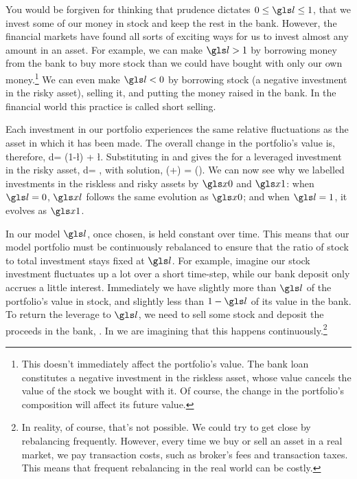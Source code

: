 You would be forgiven for thinking that prudence dictates $0\leq\l\leq1$, \ie that we invest some of our money in stock and keep the rest in the bank. However, the financial markets have found all sorts of exciting ways for us to invest almost any amount in an asset. For example, we can make $\l>1$ by borrowing money from the bank to buy more stock than we could have bought with only our own money.\footnote{This doesn't immediately affect the portfolio's value. The bank loan constitutes a negative investment in the riskless asset, whose value cancels the value of the stock we bought with it. Of course, the change in the portfolio's composition will affect its future value.} We can even make $\l<0$ by borrowing stock (a negative investment in the risky asset), selling it, and putting the money raised in the bank. In the financial world this practice is called short selling.

Each investment in our portfolio experiences the same relative fluctuations as the asset in which it has been made. The overall change in the portfolio's value is, therefore,
\be
d\xl = (1-\l)\xl {} + \l \xl {}.
\ee
Substituting in  and  gives the \SDE for a leveraged investment in the risky asset,
\be
d\xl = ,
\ee
with solution,
\be
\xl(\tn+\Dt) = \xl(\tn)\exp{}.
\ee
We can now see why we labelled investments in the riskless and risky assets by $\xzero$ and $\xone$: when $\l=0$, $\xl$ follows the same evolution as $\xzero$; and when $\l=1$, it evolves as $\xone$.

In our model $\l$, once chosen, is held constant over time. This means that our model portfolio must be continuously rebalanced to ensure that the ratio of stock to total investment stays fixed at $\l$. For example, imagine our stock investment fluctuates up a lot over a short time-step, while our bank deposit only accrues a little interest. Immediately we have slightly more than $\l$ of the portfolio's value in stock, and slightly less than $1-\l$ of its value in the bank. To return the leverage to $\l$, we need to sell some stock and deposit the proceeds in the bank, . In  we are imagining that this happens continuously.\footnote{In reality, of course, that's not possible. We could try to get close by rebalancing frequently. However, every time we buy or sell an asset in a real market, we pay transaction costs, such as broker's fees and transaction taxes. This means that frequent rebalancing in the real world can be costly.}

